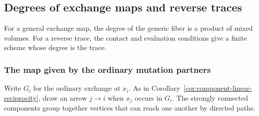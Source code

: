 \documentclass[11pt,reqno]{amsart}
\numberwithin{equation}{section}
\theoremstyle{definition}
\theoremstyle{remark}
\begin{document}
\subsection{Degrees of exchange maps and reverse traces}

For a general exchange map, the degree of the generic fiber is a
product of mixed volumes. For a reverse trace, the contact and
evaluation conditions give a finite scheme whose degree is the trace.

\subsubsection{The map given by the ordinary mutation partners}

Write \(G_i\) for the ordinary exchange at \(x_i\). As in
Corollary~\ref{cor:component-linear-reciprocity}, draw an arrow
\(j\to i\) when \(x_j\) occurs in \(G_i\). The strongly connected
components group together vertices that can reach one another by directed paths.
\end{document}
